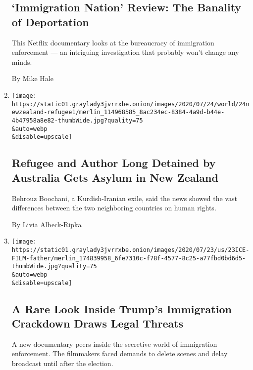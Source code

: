 \begin{enumerate}
{  \subsection{`Immigration Nation' Review: The Banality of
  Deportation}\label{immigration-nation-review-the-banality-of-deportation}}

  This Netflix documentary looks at the bureaucracy of immigration
  enforcement --- an intriguing investigation that probably won't change
  any minds.

  By Mike Hale
\item
  \href{/2020/07/24/world/australia/behrouz-boochani-asylum-new-zealand.html}{}

  \texttt{[image: https://static01.graylady3jvrrxbe.onion/images/2020/07/24/world/24newzealand-refugee1/merlin\_114968585\_8ac234ec-8384-4a9d-b44e-4b47958a8e82-thumbWide.jpg?quality=75\\\&auto=webp\\\&disable=upscale]}

  \hypertarget{refugee-and-author-long-detained-by-australia-gets-asylum-in-new-zealand}{%
  \subsection{Refugee and Author Long Detained by Australia Gets Asylum
  in New
  Zealand}\label{refugee-and-author-long-detained-by-australia-gets-asylum-in-new-zealand}}

  Behrouz Boochani, a Kurdish-Iranian exile, said the news showed the
  vast differences between the two neighboring countries on human
  rights.

  By Livia Albeck-Ripka
\item
  \href{/2020/07/23/us/trump-immigration-nation-netflix.html}{}

  \texttt{[image: https://static01.graylady3jvrrxbe.onion/images/2020/07/23/us/23ICE-FILM-father/merlin\_174839958\_6fe7310c-f78f-4577-8c25-a77fbd0bd6d5-thumbWide.jpg?quality=75\\\&auto=webp\\\&disable=upscale]}

  \hypertarget{a-rare-look-inside-trumps-immigration-crackdown-draws-legal-threats}{%
  \subsection{A Rare Look Inside Trump's Immigration Crackdown Draws
  Legal
  Threats}\label{a-rare-look-inside-trumps-immigration-crackdown-draws-legal-threats}}

  A new documentary peers inside the secretive world of immigration
  enforcement. The filmmakers faced demands to delete scenes and delay
  broadcast until after the election.


\end{enumerate}
